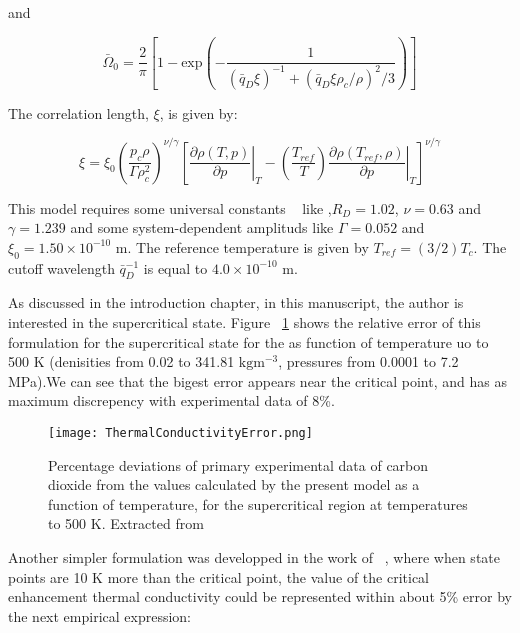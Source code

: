 and

\begin{equation}
	\bar{\Omega}_0 = \frac{2}{\pi}\left[ 1 - \mathrm{exp}\left( - \frac{1}{(\bar{q}_D\xi)^{-1} + (\bar{q}_D\xi\rho_c/\rho)^2/3}\right)\right]
\end{equation}

The correlation length, $\xi$, is given by:

\begin{equation}
	\xi = \xi_0\left(\frac{p_c\rho}{\Gamma\rho_c^2}\right)^{\nu/\gamma}
	\left[ \left. \frac{\partial \rho(T,p)}{\partial p} \right|_{T} - \left(\frac{T_{ref}}{T}\right) \left.\frac{\partial \rho(T_{ref},\rho)}{\partial p}\right|_{T}\right]^{\nu/\gamma}
\end{equation}

This model requires some universal constants ~\cite{perkins2013simplified} like
,$R_D = 1.02$, $\nu =0.63$ and $\gamma = 1.239$ and some system-dependent
amplituds like $\Gamma = 0.052$ and $\xi_0 = 1.50 \times 10^{-10}$ m. The
reference temperature is given by $T_{ref} = (3/2)T_c$. The cutoff wavelength
$\bar{q}_D^{-1}$ is equal to $4.0 \times 10^{-10}$ m. 

As discussed in the introduction chapter, in this manuscript, the author is
interested in the supercritical state. Figure
~\ref{fig:ThermalConductivityError} shows the relative error of this formulation
for the supercritical state for the  as function of temperature uo to
500 K (denisities from 0.02 to 341.81 $\mathrm{kg m^{-3}}$, pressures from
0.0001 to 7.2 MPa).We can see that the bigest error appears near the critical
point, and has as maximum discrepency with experimental data of 8\%.

\begin{figure}[h!]
	\centering
	\texttt{[image: ThermalConductivityError.png]}
	\caption{Percentage deviations of primary experimental data of carbon dioxide
	from the values calculated by the present model as a function of
	temperature, for the supercritical region at temperatures to 500 K.
	Extracted from \cite{huber2016reference}}
\label{fig:ThermalConductivityError}
\end{figure}


Another simpler formulation was developped in the work of
~\cite{huber2016reference}, where when state points are 10 K more than the
critical point, the value of the critical enhancement thermal conductivity could
be represented within about 5\% error by the next empirical expression:

